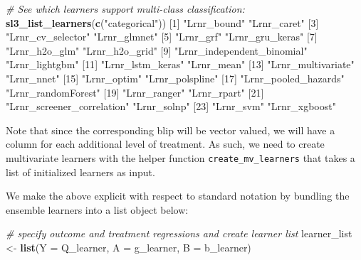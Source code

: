 \documentclass[12pt, krantz2,]{krantz}
\newenvironment{Shaded}{\begin{snugshade}}{\end{snugshade}}
\newcommand{\CommentTok}[1]{\textcolor[rgb]{0.37,0.37,0.37}{\textit{#1}}}
\newcommand{\DataTypeTok}[1]{\textcolor[rgb]{0.27,0.27,0.27}{#1}}
\newcommand{\DecValTok}[1]{\textcolor[rgb]{0.06,0.06,0.06}{#1}}
\newcommand{\KeywordTok}[1]{\textcolor[rgb]{0.27,0.27,0.27}{\textbf{#1}}}
\newcommand{\NormalTok}[1]{#1}
\newcommand{\StringTok}[1]{\textcolor[rgb]{0.5,0.5,0.5}{#1}}
\theoremstyle{definition}
\theoremstyle{definition}
\theoremstyle{definition}
\newcommand{\1}{\mathbbm{1}}
\begin{document}
\begin{Shaded}
\begin{Highlighting}[]
\CommentTok{# See which learners support multi-class classification:}
\KeywordTok{sl3_list_learners}\NormalTok{(}\KeywordTok{c}\NormalTok{(}\StringTok{"categorical"}\NormalTok{))}
\NormalTok{ [}\DecValTok{1}\NormalTok{] }\StringTok{"Lrnr_bound"}                \StringTok{"Lrnr_caret"}               
\NormalTok{ [}\DecValTok{3}\NormalTok{] }\StringTok{"Lrnr_cv_selector"}          \StringTok{"Lrnr_glmnet"}              
\NormalTok{ [}\DecValTok{5}\NormalTok{] }\StringTok{"Lrnr_grf"}                  \StringTok{"Lrnr_gru_keras"}           
\NormalTok{ [}\DecValTok{7}\NormalTok{] }\StringTok{"Lrnr_h2o_glm"}              \StringTok{"Lrnr_h2o_grid"}            
\NormalTok{ [}\DecValTok{9}\NormalTok{] }\StringTok{"Lrnr_independent_binomial"} \StringTok{"Lrnr_lightgbm"}            
\NormalTok{[}\DecValTok{11}\NormalTok{] }\StringTok{"Lrnr_lstm_keras"}           \StringTok{"Lrnr_mean"}                
\NormalTok{[}\DecValTok{13}\NormalTok{] }\StringTok{"Lrnr_multivariate"}         \StringTok{"Lrnr_nnet"}                
\NormalTok{[}\DecValTok{15}\NormalTok{] }\StringTok{"Lrnr_optim"}                \StringTok{"Lrnr_polspline"}           
\NormalTok{[}\DecValTok{17}\NormalTok{] }\StringTok{"Lrnr_pooled_hazards"}       \StringTok{"Lrnr_randomForest"}        
\NormalTok{[}\DecValTok{19}\NormalTok{] }\StringTok{"Lrnr_ranger"}               \StringTok{"Lrnr_rpart"}               
\NormalTok{[}\DecValTok{21}\NormalTok{] }\StringTok{"Lrnr_screener_correlation"} \StringTok{"Lrnr_solnp"}               
\NormalTok{[}\DecValTok{23}\NormalTok{] }\StringTok{"Lrnr_svm"}                  \StringTok{"Lrnr_xgboost"}             
\end{Highlighting}
\end{Shaded}

Note that since the corresponding blip will be vector valued, we will have a
column for each additional level of treatment. As such, we need to create
multivariate learners with the helper function \texttt{create\_mv\_learners} that takes a
list of initialized learners as input.

We make the above explicit with respect to standard notation by bundling the
ensemble learners into a list object below:

\begin{Shaded}
\begin{Highlighting}[]
\CommentTok{# specify outcome and treatment regressions and create learner list}
\NormalTok{learner_list <-}\StringTok{ }\KeywordTok{list}\NormalTok{(}\DataTypeTok{Y =}\NormalTok{ Q_learner, }\DataTypeTok{A =}\NormalTok{ g_learner, }\DataTypeTok{B =}\NormalTok{ b_learner)}
\end{Highlighting}
\end{Shaded}
\end{document}
